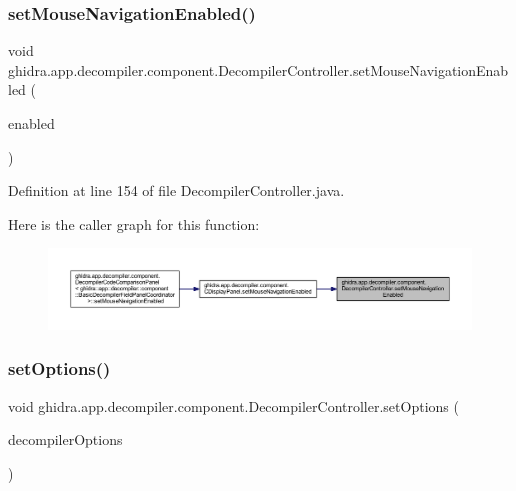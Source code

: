 \subsubsection{\texorpdfstring{setMouseNavigationEnabled()}{setMouseNavigationEnabled()}}
{\footnotesize\ttfamily void ghidra.\+app.\+decompiler.\+component.\+Decompiler\+Controller.\+set\+Mouse\+Navigation\+Enabled (\begin{DoxyParamCaption}\item[{boolean}]{enabled }\end{DoxyParamCaption})\hspace{0.3cm}{\ttfamily [inline]}}



Definition at line 154 of file Decompiler\+Controller.\+java.

Here is the caller graph for this function\+:
\nopagebreak
\begin{figure}[H]
\begin{center}
\leavevmode
\includegraphics[width=350pt]{classghidra_1_1app_1_1decompiler_1_1component_1_1_decompiler_controller_a2c2f9e954a06f788a8571cf836f89f46_icgraph}
\end{center}
\end{figure}
\mbox{\label{classghidra_1_1app_1_1decompiler_1_1component_1_1_decompiler_controller_aaf14081587bb40519aafb382238d5a5d}} 
\subsubsection{\texorpdfstring{setOptions()}{setOptions()}}
{\footnotesize\ttfamily void ghidra.\+app.\+decompiler.\+component.\+Decompiler\+Controller.\+set\+Options (\begin{DoxyParamCaption}\item[{\mbox{\hyperlink{classghidra_1_1app_1_1decompiler_1_1_decompile_options}{Decompile\+Options}}}]{decompiler\+Options }\end{DoxyParamCaption})\hspace{0.3cm}{\ttfamily [inline]}}

